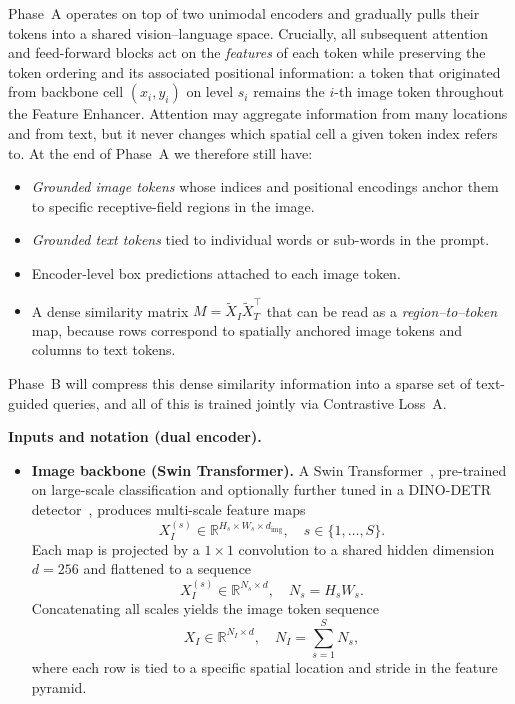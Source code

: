 \begin{enrichment}
\begin{enrichment}[Method][subsection]
		Phase~A operates on top of two unimodal encoders and gradually pulls their tokens into a shared vision--language space. Crucially, all subsequent attention and feed-forward blocks act on the \emph{features} of each token while preserving the token ordering and its associated positional information: a token that originated from backbone cell \((x_i,y_i)\) on level \(s_i\) remains the \(i\)-th image token throughout the Feature Enhancer. Attention may aggregate information from many locations and from text, but it never changes which spatial cell a given token index refers to. At the end of Phase~A we therefore still have:
		\begin{itemize}
			\item \emph{Grounded image tokens} whose indices and positional encodings anchor them to specific receptive-field regions in the image.
			\item \emph{Grounded text tokens} tied to individual words or sub-words in the prompt.
			\item Encoder-level box predictions attached to each image token.
			\item A dense similarity matrix \(M = \tilde{X}_I \tilde{X}_T^\top\) that can be read as a \emph{region--to--token} map, because rows correspond to spatially anchored image tokens and columns to text tokens.
		\end{itemize}
		Phase~B will compress this dense similarity information into a sparse set of text-guided queries, and all of this is trained jointly via Contrastive Loss~A.
		
		\medskip
		
		\noindent\textbf{Inputs and notation (dual encoder).}
		\begin{itemize}
			\item \textbf{Image backbone (Swin Transformer).}  
			A Swin Transformer~\cite{liu2021_swin}, pre-trained on large-scale classification and optionally further tuned in a DINO-DETR detector~\cite{zhang2022_dino}, produces multi-scale feature maps
			\[
			X_I^{(s)} \in \mathbb{R}^{H_s \times W_s \times d_{\text{img}}}, \quad s \in \{1,\dots,S\}.
			\]
			Each map is projected by a \(1\times 1\) convolution to a shared hidden dimension \(d = 256\) and flattened to a sequence
			\[
			X_I^{(s)} \in \mathbb{R}^{N_s \times d}, \quad N_s = H_s W_s.
			\]
			Concatenating all scales yields the image token sequence
			\[
			X_I \in \mathbb{R}^{N_I \times d}, \quad N_I = \sum_{s=1}^{S} N_s,
			\]
			where each row is tied to a specific spatial location and stride in the feature pyramid.
			

\end{itemize}
\end{enrichment}
\end{enrichment}
